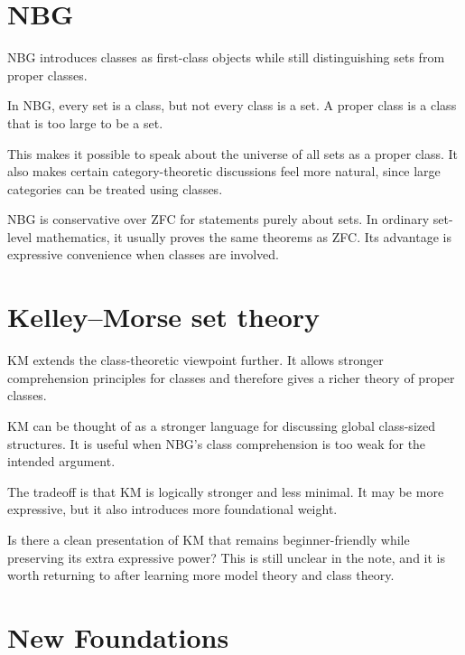 \section{NBG}

NBG introduces classes as first-class objects while still distinguishing sets from proper classes.

\begin{definition}
In NBG, every set is a class, but not every class is a set.  A proper class is a class that is too large to be a set.
\end{definition}

This makes it possible to speak about the universe of all sets as a proper class.  It also makes certain category-theoretic discussions feel more natural, since large categories can be treated using classes.

\begin{remark}
NBG is conservative over ZFC for statements purely about sets.  In ordinary set-level mathematics, it usually proves the same theorems as ZFC.  Its advantage is expressive convenience when classes are involved.
\end{remark}


\section{Kelley--Morse set theory}

KM extends the class-theoretic viewpoint further.  It allows stronger comprehension principles for classes and therefore gives a richer theory of proper classes.

\begin{remark}
KM can be thought of as a stronger language for discussing global class-sized structures.  It is useful when NBG's class comprehension is too weak for the intended argument.
\end{remark}

The tradeoff is that KM is logically stronger and less minimal.  It may be more expressive, but it also introduces more foundational weight.

\begin{question}
Is there a clean presentation of KM that remains beginner-friendly while preserving its extra expressive power?  This is still unclear in the note, and it is worth returning to after learning more model theory and class theory.
\end{question}

\section{New Foundations}

